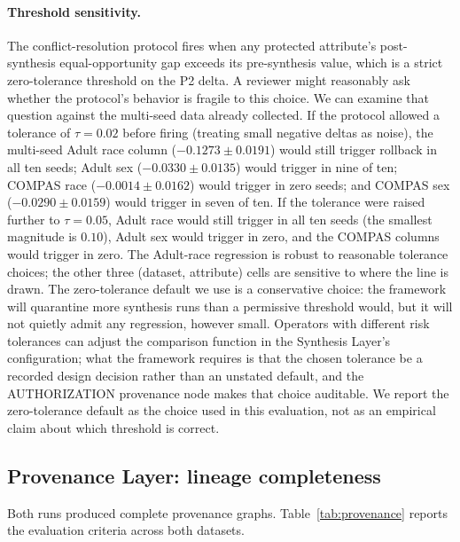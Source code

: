 \documentclass[11pt]{article}
\begin{document}
\paragraph{Threshold sensitivity.} The conflict-resolution protocol fires when any protected attribute's post-synthesis equal-opportunity gap exceeds its pre-synthesis value, which is a strict zero-tolerance threshold on the P2 delta. A reviewer might reasonably ask whether the protocol's behavior is fragile to this choice. We can examine that question against the multi-seed data already collected. If the protocol allowed a tolerance of $\tau = 0.02$ before firing (treating small negative deltas as noise), the multi-seed Adult race column ($-0.1273 \pm 0.0191$) would still trigger rollback in all ten seeds; Adult sex ($-0.0330 \pm 0.0135$) would trigger in nine of ten; COMPAS race ($-0.0014 \pm 0.0162$) would trigger in zero seeds; and COMPAS sex ($-0.0290 \pm 0.0159$) would trigger in seven of ten. If the tolerance were raised further to $\tau = 0.05$, Adult race would still trigger in all ten seeds (the smallest magnitude is $0.10$), Adult sex would trigger in zero, and the COMPAS columns would trigger in zero. The Adult-race regression is robust to reasonable tolerance choices; the other three (dataset, attribute) cells are sensitive to where the line is drawn. The zero-tolerance default we use is a conservative choice: the framework will quarantine more synthesis runs than a permissive threshold would, but it will not quietly admit any regression, however small. Operators with different risk tolerances can adjust the comparison function in the Synthesis Layer's configuration; what the framework requires is that the chosen tolerance be a recorded design decision rather than an unstated default, and the AUTHORIZATION provenance node makes that choice auditable. We report the zero-tolerance default as the choice used in this evaluation, not as an empirical claim about which threshold is correct.

\subsection{Provenance Layer: lineage completeness}

Both runs produced complete provenance graphs. Table~\ref{tab:provenance} reports the evaluation criteria across both datasets.
\end{document}
